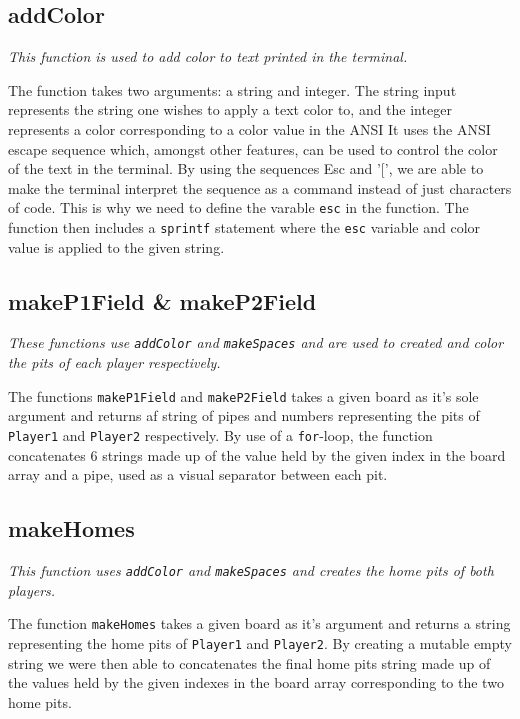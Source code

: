 \documentclass[a4paper]{report}
\begin{document}
\subsection*{addColor}
{\it This function is used to add color to text printed in the terminal.}

The function takes two arguments: a string and integer. The string input represents the string one wishes to apply a text color to, and the integer represents a color corresponding to a color value in the ANSI
It uses the ANSI escape sequence which, amongst other features, can be used to control the color of the text in the terminal. By using the sequences Esc and '[', we are able to make the terminal interpret the sequence as a command instead of just characters of code. This is why we need to define the varable \texttt{esc} in the function. The function then includes a \texttt{sprintf} statement where the \texttt{esc} variable and color value is applied to the given string.

\subsection*{makeP1Field \& makeP2Field}
{\it These functions use \texttt{addColor} and \texttt{makeSpaces} and are used to created and color the pits of each player respectively.}


The functions \texttt{makeP1Field} and \texttt{makeP2Field} takes a given board as it's sole argument and returns af string of pipes and numbers representing the pits of \texttt{Player1} and \texttt{Player2} respectively. By use of a \texttt{for}-loop, the function concatenates 6 strings made up of the value held by the given index in the board array and a pipe, used as a visual separator between each pit.


\subsection*{makeHomes}
{\it This function uses \texttt{addColor} and \texttt{makeSpaces} and creates the home pits of both players.}

The function \texttt{makeHomes} takes a given board as it's argument and returns a string representing the home pits of \texttt{Player1} and \texttt{Player2}. By creating a mutable empty string we were then able to concatenates the final home pits string made up of the values held by the given indexes in the board array corresponding to the two home pits.
\end{document}
